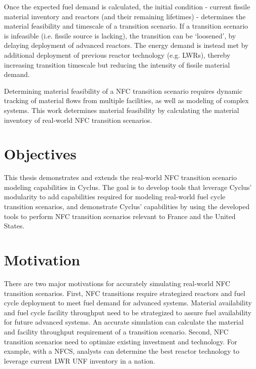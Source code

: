 Once the expected fuel demand is calculated,
the initial condition - current fissile material inventory
and reactors (and their remaining lifetimes) - determines
the material feasibility and timescale of a transition scenario.
If a transition scenario is infeasible (i.e. fissile source is lacking),
the transition can be `loosened', by delaying deployment
of advanced reactors. The energy demand is instead met by additional
deployment of previous reactor technology (e.g. \glspl{LWR}),
thereby increasing transition timescale but reducing the
intensity of fissile material demand.

Determining material feasibility of a \gls{NFC} transition scenario
requires dynamic tracking of material flows from multiple facilities,
as well as modeling of complex systems. This work
determines material feasibility by calculating
the material inventory of real-world \gls{NFC} transition scenarios.


\section{Objectives}

This thesis demonstrates and extends the real-world \gls{NFC} transition
scenario modeling capabilities in Cyclus. 
The goal is to
develop tools that leverage Cyclus' modularity to
add capabilities required for modeling real-world
fuel cycle transition scenarios, and demonstrate Cyclus'
capabilities by using the developed tools to perform
\gls{NFC} transition scenarios relevant to France and the United
States.

\section{Motivation}

There are two major motivations for accurately simulating
real-world \gls{NFC} transition scenarios.
First, \gls{NFC} transitions require strategized reactors
and fuel cycle deployment to meet fuel demand for advanced systems.
Material availability and fuel cycle facility
throughput need to be strategized 
to assure fuel availability for future advanced systems.
An accurate simulation can calculate the material
and facility throughput requirement of a transition scenario.
Second, \gls{NFC} transition scenarios need to optimize
existing investment and technology. For example, with a \gls{NFCS},
analysts can determine the best reactor technology
to leverage current \gls{LWR} \gls{UNF} inventory in a nation.


